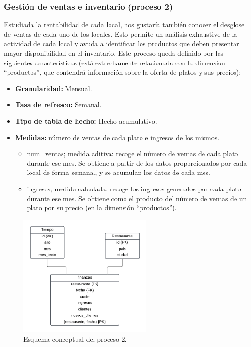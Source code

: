 \documentclass[12pt]{opticajnl}
\begin{document}
\subsubsection{Gestión de ventas e inventario (proceso 2)}

Estudiada la rentabilidad de cada local, nos gustaría también conocer el desglose de ventas de cada uno de los locales. Esto permite un análisis exhaustivo de la actividad de cada local y ayuda a identificar los productos que deben presentar mayor disponibilidad en el inventario. Este proceso queda definido por las siguientes características (está estrechamente relacionado con la dimensión ``productos'', que contendrá información sobre la oferta de platos y sus precios):
\begin{itemize}
\item \textbf{Granularidad:} Mensual.
\item \textbf{Tasa de refresco:} Semanal.
\item \textbf{Tipo de tabla de hecho:} Hecho acumulativo.
\item \textbf{Medidas:} número de ventas de cada plato e ingresos de los mismos.
\begin{itemize}
\item num\_ventas; medida aditiva: recoge el número de ventas de cada plato durante ese mes. Se obtiene a partir de los datos proporcionados por cada local de forma semanal, y se acumulan los datos de cada mes.
\item ingresos; medida calculada: recoge los ingresos generados por cada plato durante ese mes. Se obtiene como el producto del número de ventas de un plato por su precio (en la dimensión ``productos'').
\end{itemize}
\end{itemize}

\begin{figure}[h]
\centering
\includegraphics[width=0.6\textwidth]{fotos/prods.pdf}
\caption{Esquema conceptual del proceso 2.}
\label{fig:esquema_proceso2}
\end{figure}
\end{document}
